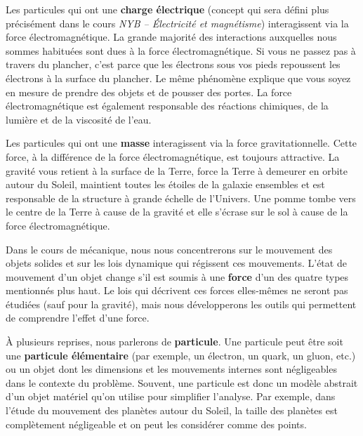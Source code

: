 Les particules qui ont une \textbf{charge électrique} (concept qui sera défini
plus précisément dans le cours \emph{NYB -- Électricité et magnétisme})
interagissent via la force électromagnétique.  La grande majorité des
interactions auxquelles nous sommes habituées sont dues à la force
électromagnétique.  Si vous ne passez pas à travers du plancher, c'est parce
que les électrons sous vos pieds repoussent les électrons à la surface du
plancher.  Le même phénomène explique que vous soyez en mesure de prendre des
objets et de pousser des portes.  La force électromagnétique est également
responsable des réactions chimiques, de la lumière et de la viscosité de l'eau.

Les particules qui ont une \textbf{masse} interagissent via la force
gravitationnelle.  Cette force, à la différence de la force électromagnétique,
est toujours attractive.  La gravité vous retient à la surface de la Terre,
force la Terre à demeurer en orbite autour du Soleil, maintient toutes les
étoiles de la galaxie ensembles et est responsable de la structure à grande
échelle de l'Univers.  Une pomme tombe vers le centre de la Terre à cause de la
gravité et elle s'écrase sur le sol à cause de la force électromagnétique.

Dans le cours de mécanique, nous nous concentrerons sur le mouvement des objets
solides et sur les lois dynamique qui régissent ces mouvements.  L'état de
mouvement d'un objet change s'il est soumis à une \textbf{force} d'un des
quatre types mentionnés plus haut.  Le lois qui décrivent ces forces
elles-mêmes ne seront pas étudiées (sauf pour la gravité), mais nous
développerons les outils qui permettent de comprendre l'effet d'une force.

À plusieurs reprises, nous parlerons de \textbf{particule}.  Une particule peut
être soit une \textbf{particule élémentaire} (par exemple, un électron, un
quark, un gluon, etc.) ou un objet dont les dimensions et les mouvements
internes sont négligeables dans le contexte du problème.
Souvent, une particule est donc un modèle abstrait d'un objet matériel qu'on
utilise pour simplifier l'analyse.  Par exemple, dans l'étude du mouvement des
planètes autour du Soleil, la taille des planètes est complètement négligeable
et on peut les considérer comme des points.


